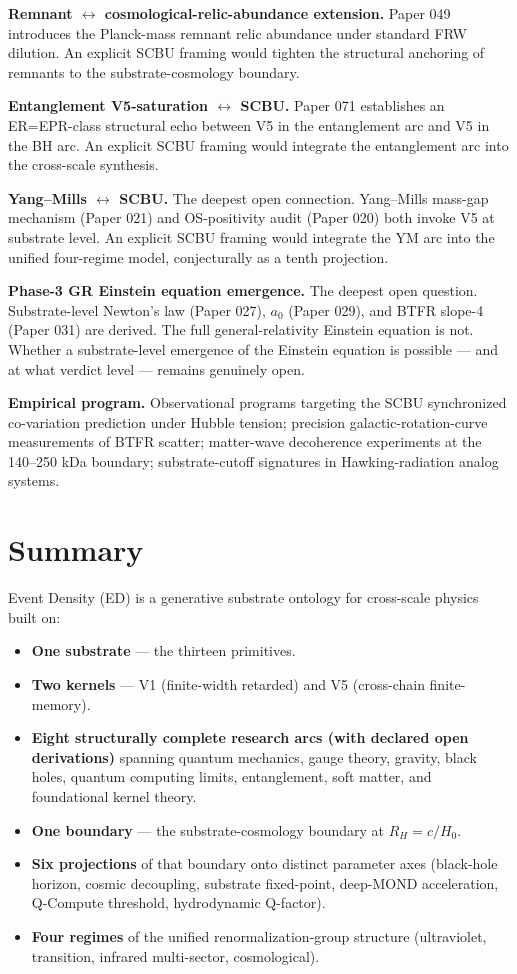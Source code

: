 \documentclass[11pt,a4paper]{article}
\begin{document}
\textbf{Remnant $\leftrightarrow$ cosmological-relic-abundance extension.} Paper 049 introduces the Planck-mass remnant relic abundance under standard FRW dilution. An explicit SCBU framing would tighten the structural anchoring of remnants to the substrate-cosmology boundary.

\textbf{Entanglement V5-saturation $\leftrightarrow$ SCBU.} Paper 071 establishes an ER=EPR-class structural echo between V5 in the entanglement arc and V5 in the BH arc. An explicit SCBU framing would integrate the entanglement arc into the cross-scale synthesis.

\textbf{Yang--Mills $\leftrightarrow$ SCBU.} The deepest open connection. Yang--Mills mass-gap mechanism (Paper 021) and OS-positivity audit (Paper 020) both invoke V5 at substrate level. An explicit SCBU framing would integrate the YM arc into the unified four-regime model, conjecturally as a tenth projection.

\textbf{Phase-3 GR Einstein equation emergence.} The deepest open question. Substrate-level Newton's law (Paper 027), $a_0$ (Paper 029), and BTFR slope-4 (Paper 031) are derived. The full general-relativity Einstein equation is not. Whether a substrate-level emergence of the Einstein equation is possible --- and at what verdict level --- remains genuinely open.

\textbf{Empirical program.} Observational programs targeting the SCBU synchronized co-variation prediction under Hubble tension; precision galactic-rotation-curve measurements of BTFR scatter; matter-wave decoherence experiments at the 140--250 kDa boundary; substrate-cutoff signatures in Hawking-radiation analog systems.

\section{Summary}

Event Density (ED) is a generative substrate ontology for cross-scale physics built on:

\begin{itemize}[noitemsep]
\item \textbf{One substrate} --- the thirteen primitives.
\item \textbf{Two kernels} --- V1 (finite-width retarded) and V5 (cross-chain finite-memory).
\item \textbf{Eight structurally complete research arcs (with declared open derivations)} spanning quantum mechanics, gauge theory, gravity, black holes, quantum computing limits, entanglement, soft matter, and foundational kernel theory.
\item \textbf{One boundary} --- the substrate-cosmology boundary at $R_H = c/H_0$.
\item \textbf{Six projections} of that boundary onto distinct parameter axes (black-hole horizon, cosmic decoupling, substrate fixed-point, deep-MOND acceleration, Q-Compute threshold, hydrodynamic Q-factor).
\item \textbf{Four regimes} of the unified renormalization-group structure (ultraviolet, transition, infrared multi-sector, cosmological).
\end{itemize}
\end{document}
